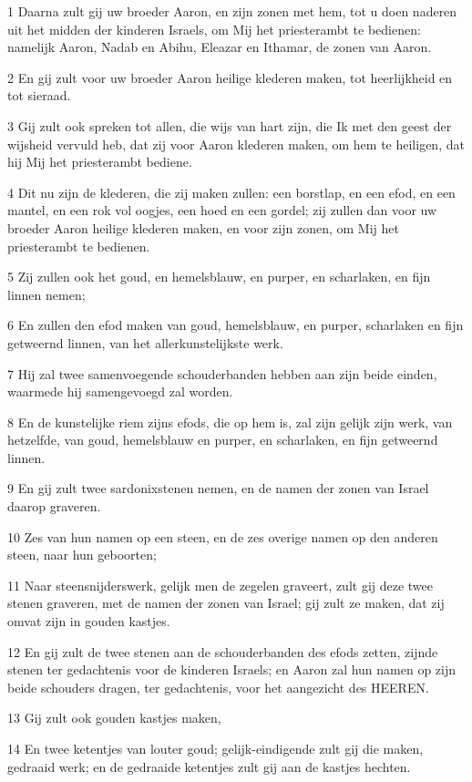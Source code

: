 \par 1 Daarna zult gij uw broeder Aaron, en zijn zonen met hem, tot u doen naderen uit het midden der kinderen Israels, om Mij het priesterambt te bedienen: namelijk Aaron, Nadab en Abihu, Eleazar en Ithamar, de zonen van Aaron.
\par 2 En gij zult voor uw broeder Aaron heilige klederen maken, tot heerlijkheid en tot sieraad.
\par 3 Gij zult ook spreken tot allen, die wijs van hart zijn, die Ik met den geest der wijsheid vervuld heb, dat zij voor Aaron klederen maken, om hem te heiligen, dat hij Mij het priesterambt bediene.
\par 4 Dit nu zijn de klederen, die zij maken zullen: een borstlap, en een efod, en een mantel, en een rok vol oogjes, een hoed en een gordel; zij zullen dan voor uw broeder Aaron heilige klederen maken, en voor zijn zonen, om Mij het priesterambt te bedienen.
\par 5 Zij zullen ook het goud, en hemelsblauw, en purper, en scharlaken, en fijn linnen nemen;
\par 6 En zullen den efod maken van goud, hemelsblauw, en purper, scharlaken en fijn getweernd linnen, van het allerkunstelijkste werk.
\par 7 Hij zal twee samenvoegende schouderbanden hebben aan zijn beide einden, waarmede hij samengevoegd zal worden.
\par 8 En de kunstelijke riem zijns efods, die op hem is, zal zijn gelijk zijn werk, van hetzelfde, van goud, hemelsblauw en purper, en scharlaken, en fijn getweernd linnen.
\par 9 En gij zult twee sardonixstenen nemen, en de namen der zonen van Israel daarop graveren.
\par 10 Zes van hun namen op een steen, en de zes overige namen op den anderen steen, naar hun geboorten;
\par 11 Naar steensnijderswerk, gelijk men de zegelen graveert, zult gij deze twee stenen graveren, met de namen der zonen van Israel; gij zult ze maken, dat zij omvat zijn in gouden kastjes.
\par 12 En gij zult de twee stenen aan de schouderbanden des efods zetten, zijnde stenen ter gedachtenis voor de kinderen Israels; en Aaron zal hun namen op zijn beide schouders dragen, ter gedachtenis, voor het aangezicht des HEEREN.
\par 13 Gij zult ook gouden kastjes maken,
\par 14 En twee ketentjes van louter goud; gelijk-eindigende zult gij die maken, gedraaid werk; en de gedraaide ketentjes zult gij aan de kastjes hechten.
